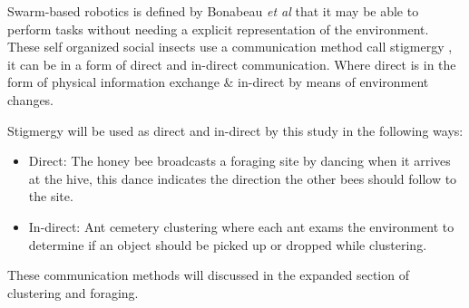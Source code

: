 \documentclass[12pt]{article}
\begin{document}
\par{Swarm-based robotics is defined by Bonabeau \textit{et al} \cite{Robot-Swarm} that it may be able to perform tasks without needing a explicit representation of the environment. These self organized social insects use a communication method call stigmergy \cite{Robot-Swarm}, it can be in a form of direct and in-direct communication. Where direct is in the form of physical information exchange \& in-direct by means of environment changes.
\\
\par{Stigmergy will be used as direct and in-direct by this study in the following ways:}
\begin{itemize}
	\item Direct:
			The honey bee broadcasts a foraging site by dancing when it arrives at 					the	hive, this dance indicates the direction the other bees should follow to the site. 
	\item In-direct:
			Ant cemetery clustering where each ant exams the environment to determine if an object should be picked up or dropped while clustering.
\end{itemize}
\par{These communication methods will discussed in the expanded section of clustering and foraging.}

}
\end{document}
